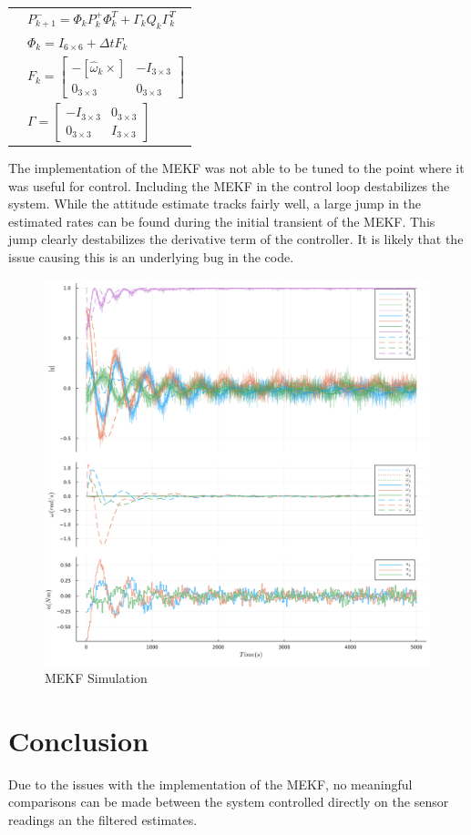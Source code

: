 \documentclass{article}
\begin{document}
\begin{table}
\begin{tabular}{ll}
	 & $P_{k+1}^- = \Phi_k P_k^+ \Phi_k^T + \Gamma_k Q_k \Gamma_k^T$ \\
	 & $\Phi_k = I_{6 \times 6} + \Delta t F_k$ \\
	 & $F_k = \left[\begin{matrix}-[\hat{\omega}_k \times] & -I_{3 \times 3} \\ 0_{3 \times 3} & 0_{3 \times 3}\end{matrix}\right]$ \\
	 & $\Gamma = \left[\begin{matrix} -I_{3 \times 3} & 0_{3 \times 3} \\ 0_{3 \times 3} & I_{3 \times 3}\end{matrix}\right]$ \\
	\hline
\end{tabular}
\end{table}

The implementation of the MEKF was not able to be tuned to the point where it was useful for control. Including the MEKF in the control loop destabilizes the system. While the attitude estimate tracks fairly well, a large jump in the estimated rates can be found during the initial transient of the MEKF. This jump clearly destabilizes the derivative term of the controller. It is likely that the issue causing this is an underlying bug in the code.

\begin{figure}[h]
	\centering
	\includegraphics[width=12cm]{images/pd_noise_mekf_attitude_lvlh}
	\caption{MEKF Simulation}
	\label{fig:mekf}
\end{figure}

\section{Conclusion}

Due to the issues with the implementation of the MEKF, no meaningful comparisons can be made between the system controlled directly on the sensor readings an the filtered estimates.



\nocite{*}
\end{document}
